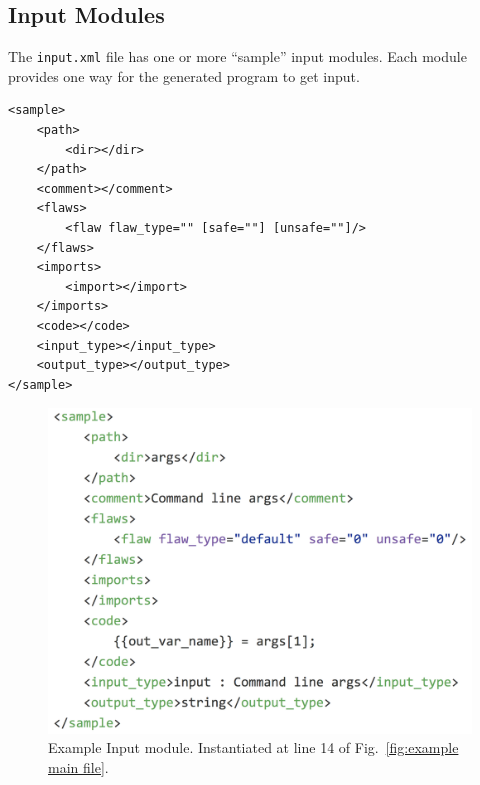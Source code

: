 \documentclass[12pt]{article}
\begin{document}
\subsection{Input Modules}
\label{sec: input module}

The \verb|input.xml| file has one or more ``sample'' input modules.  Each module
provides one way for the generated program to get input.

\begin{verbatim}
<sample>
    <path>
        <dir></dir>
    </path>
    <comment></comment>
    <flaws>
        <flaw flaw_type="" [safe=""] [unsafe=""]/>
    </flaws>
    <imports>
        <import></import>
    </imports>
    <code></code>
    <input_type></input_type>
    <output_type></output_type>
</sample>
\end{verbatim}

\begin{figure}[htb]
  \includegraphics{fig_Input_file.png}
  \caption{Example Input module.  Instantiated at line 14 of 
  Fig.~\ref{fig:example main file}.}
  \label{fig:example input file}
\end{figure}
\end{document}
